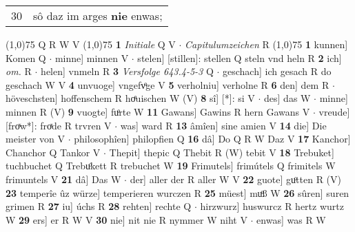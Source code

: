 \documentclass[8pt,a4paper,notitlepage]{article}
\begin{document}
\begin{table}[ht]
\begin{minipage}[t]{0.5\linewidth}
\begin{tabular}{rl}
30 & sô daz im arges \textbf{nie} enwas;\\ 
\end{tabular}
\scriptsize
\line(1,0){75} \newline
Q R W V \newline
\line(1,0){75} \newline
\textbf{1} \textit{Initiale} Q V   $\cdot$ \textit{Capitulumzeichen} R  \newline
\line(1,0){75} \newline
\textbf{1} kunnen] Komen Q  $\cdot$ minne] minnen V  $\cdot$ stelen] [stillen]: stellen Q steln vnd heln R \textbf{2} ich] \textit{om.} R  $\cdot$ helen] vnmeln R \textbf{3} \textit{Versfolge 643.4-5-3} Q   $\cdot$ geschach] ich gesach R do geschach W V \textbf{4} unvuoge] vngefvͦge V \textbf{5} verholniu] verholne R \textbf{6} den] dem R  $\cdot$ höveschsten] hoffenschem R hoͤuischen W (V) \textbf{8} sî] [*]: si V  $\cdot$ des] das W  $\cdot$ minne] minnen R (V) \textbf{9} vuogte] fuͦrte W \textbf{11} Gawans] Gawins R hern Gawans V  $\cdot$ vreude] [froͯw*]: froͯde R trvren V  $\cdot$ was] ward R \textbf{13} âmîen] sine amien V \textbf{14} die] Die meister von V  $\cdot$ philosophîen] philopfien Q \textbf{16} dâ] Do Q R W Daz V \textbf{17} Kanchor] Chanchor Q Tankor V  $\cdot$ Thepit] thepic Q Thebit R (W) tebit V \textbf{18} Trebuket] tuchbuchet Q Trebuͦkett R trebuchet W \textbf{19} Frimutels] frimútels Q frimitels W frimuntels V \textbf{21} dâ] Das W  $\cdot$ der] aller der R aller W V \textbf{22} guote] guͦtten R (V) \textbf{23} temperîe ûz würze] temperieren wurczen R \textbf{25} müest] muͦß W \textbf{26} sûren] suren grimen R \textbf{27} iu] úchs R \textbf{28} rehten] rechte Q  $\cdot$ hirzwurz] huswurcz R hertz wurtz W \textbf{29} ers] er R W V \textbf{30} nie] nit nie R nymmer W niht V  $\cdot$ enwas] was R W \newline
\end{minipage}
\end{table}
\end{document}
